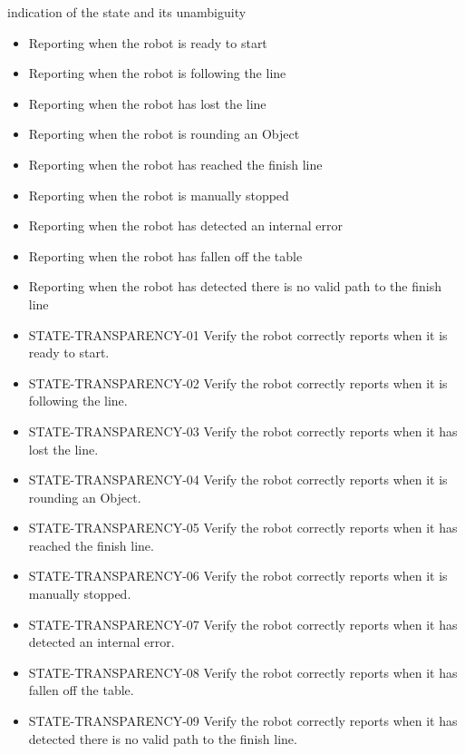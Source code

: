 \begin{itemize}
        {indication of the state and its unambiguity}
        {
            \begin{itemize}
                \item Reporting when the robot is ready to start
                \item Reporting when the robot is following the line
                \item Reporting when the robot has lost the line
                \item Reporting when the robot is rounding an Object
                \item Reporting when the robot has reached the finish line
                \item Reporting when the robot is manually stopped
                \item Reporting when the robot has detected an internal error
                \item Reporting when the robot has fallen off the table
                \item Reporting when the robot has detected there is no valid path to the finish line
            \end{itemize}
        }
        {
            \begin{itemize}
                \item STATE-TRANSPARENCY-01 \quad Verify the robot correctly reports when it is ready to start.
                \item STATE-TRANSPARENCY-02 \quad Verify the robot correctly reports when it is following the line.
                \item STATE-TRANSPARENCY-03 \quad Verify the robot correctly reports when it has lost the line.
                \item STATE-TRANSPARENCY-04 \quad Verify the robot correctly reports when it is rounding an Object.
                \item STATE-TRANSPARENCY-05 \quad Verify the robot correctly reports when it has reached the finish line.
                \item STATE-TRANSPARENCY-06 \quad Verify the robot correctly reports when it is manually stopped.
                \item STATE-TRANSPARENCY-07 \quad Verify the robot correctly reports when it has detected an internal error.
                \item STATE-TRANSPARENCY-08 \quad Verify the robot correctly reports when it has fallen off the table.
                \item STATE-TRANSPARENCY-09 \quad Verify the robot correctly reports when it has detected there is no valid path to the finish line.
            \end{itemize}
        }


\end{itemize}
